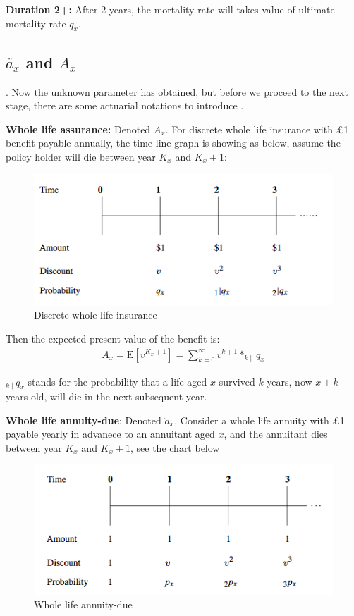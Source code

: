 \documentclass{report}
\begin{document}
\textbf{Duration 2+:} After 2 years, the mortality rate will takes value of ultimate mortality rate $q_x$.



\subsection{$\ddot{a_x}$ and $A_x$}. 
Now the unknown parameter has obtained, but before we proceed to the next stage, there are some actuarial notations to introduce \cite{bib:def-for-annuity-assurance}.

\textbf{Whole life assurance:} Denoted $A_x$. For discrete whole life insurance with \pounds1 benefit payable annually, the time line graph is showing as below, assume the policy holder will die between year $K_x$ and $K_x+1$:

\begin{figure}[H]
    \centering
    \includegraphics[width=0.8\linewidth]{fig1.png}
    \caption{Discrete whole life insurance}
\end{figure}






Then the expected present value of the benefit is:
\begin{align}
A_x = \text{E}[v^{K_x+1}] = \sum_{k=0}^{\infty} v^{k+1}*_{k\mid} q_x  \nonumber 
\end{align}

$_{k\mid} q_x$ stands for the probability that a life aged $x$ survived $k$ years, now $x+k$ years old, will die in the next subsequent year.

\textbf{Whole life annuity-due}: Denoted $\ddot{a}_x$. Consider a whole life annuity with \pounds1 payable yearly in advanece to an annuitant aged $x$, and the annuitant dies between year $K_x$ and $K_x+1$, see the chart below



\begin{figure}[H]
    \centering
    \includegraphics[width=0.8\linewidth]{fig2.png}
    \caption{Whole life annuity-due}
\end{figure}
\end{document}
